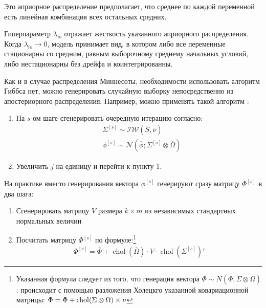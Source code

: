 \documentclass[11pt]{article} %
\DeclareMathOperator{\chol}{chol}
\newcommand{\cN}{\mathcal{N}}
\newcommand{\cIW}{\mathcal{IW}}
\newcommand{\post}{\overline}
\let\vec\relax
\DeclareMathOperator{\vec}{vec}
\begin{document}
Это априорное распределение предполагает, что среднее по каждой переменной есть линейная комбинация всех остальных средних.




Гиперпараметр $\lambda_{io}$ отражает жесткость указанного априорного распределения. Когда $\lambda_{io}\to 0 $,  модель принимает вид, в котором либо все переменные стационарны со средним, равным выборочному среднему начальных условий, либо нестационарны без дрейфа и коинтегрированны.


Как и в случае распределения Миннесоты, необходимости использовать алгоритм Гиббса нет, можно генерировать случайную выборку непосредственно из апостериорного распределения. Например, можно применять такой алгоритм \label{alg:alg2}:


\begin{enumerate}
\item На $s$-ом шаге сгенерировать очередную итерацию согласно:
\begin{align*}
&\Sigma^{[s]} \sim \cIW(\post S, \post \nu) \\
&\phi^{[s]}\sim \cN(\post \phi; \Sigma^{[s]} \otimes \post \Omega)
\end{align*}
\item Увеличить $j$ на единицу и перейти к пункту 1.
\end{enumerate}

На практике вместо генерирования вектора $\phi^{[s]}$ генерируют сразу матрицу $\Phi^{[s]}$ в два шага:

\begin{enumerate}
\item Сгенерировать матрицу $V$ размера $k\times m$  из независимых стандартных нормальных величин
\item Посчитать матрицу $\Phi^{[s]}$ по формуле:\footnote {Указанная формула следует из того, что генерация вектора $\Phi\sim N(\bar\Phi,\Sigma\otimes \bar\Omega)$: происходит с помощью разложения Холецкго указанной ковариационной матрицы: $\vec{\Phi}=\vec{\bar \Phi}+\chol (\Sigma\otimes \bar \Omega)\times \nu$}
\[
\Phi^{[s]} = \post \Phi + \chol(\post\Omega) \cdot V \cdot \chol(\Sigma^{[s]})'
\]
\end{enumerate}
\end{document}

